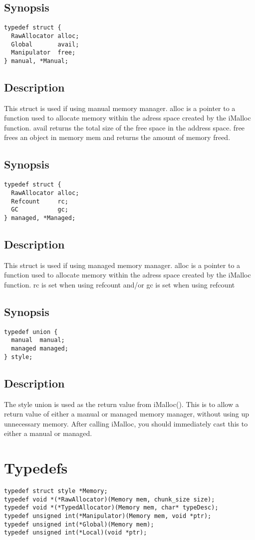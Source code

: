 \documentclass{article}
\begin{document}
\subsection*{Synopsis}
\begin{verbatim}
typedef struct {
  RawAllocator alloc;
  Global       avail;
  Manipulator  free;
} manual, *Manual; 
\end{verbatim}
\subsection*{Description}
This struct is used if using manual memory manager.
alloc is a pointer to a function used to allocate memory within the adress space created by the iMalloc function.
avail returns the total size of the free space in the address space.
free frees an object in memory mem and returns the amount of memory freed.

\subsection*{Synopsis}
\begin{verbatim}
typedef struct {
  RawAllocator alloc;
  Refcount     rc;
  GC           gc;
} managed, *Managed;
\end{verbatim}
\subsection*{Description}
This struct is used if using managed memory manager.
alloc is a pointer to a function used to allocate memory within the adress space created by the iMalloc function.
rc is set when using refcount and/or gc is set when using refcount

\subsection*{Synopsis}
\begin{verbatim}
typedef union {
  manual  manual;
  managed managed;
} style;
\end{verbatim}
\subsection*{Description}
The style union is used as the return value from iMalloc(). This is to allow a return value of either a manual or managed memory manager, without using up unnecessary memory.
After calling iMalloc, you should immediately cast this to either a manual or managed.

\section{Typedefs} 
\begin{verbatim}
typedef struct style *Memory;
typedef void *(*RawAllocator)(Memory mem, chunk_size size);
typedef void *(*TypedAllocator)(Memory mem, char* typeDesc);
typedef unsigned int(*Manipulator)(Memory mem, void *ptr);
typedef unsigned int(*Global)(Memory mem);
typedef unsigned int(*Local)(void *ptr);
\end{verbatim}
\end{document}
